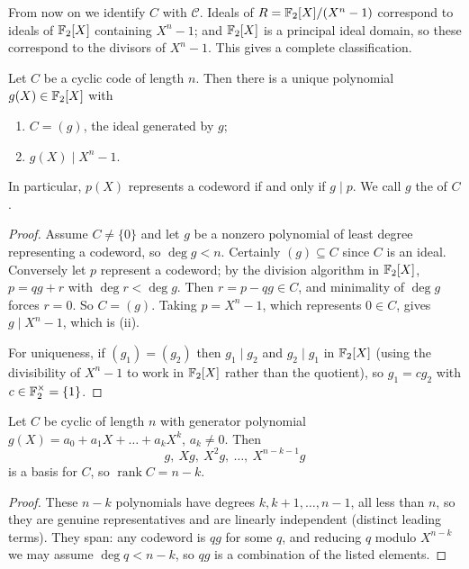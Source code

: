 \documentclass[a4paper]{scrartcl}
\DeclareMathOperator{\rank}{rank}
\newcommand{\Cc}{\mathcal{C}}
\begin{document}
From now on we identify $C$ with $\Cc$. Ideals of $R = \mathbb{F}_2[X]/(X^n-1)$ correspond to ideals of $\mathbb{F}_2[X]$ containing $X^n-1$; and $\mathbb{F}_2[X]$ is a principal ideal domain, so these correspond to the divisors of $X^n - 1$. This gives a complete classification.

\begin{theorem}\label{thm:genpoly}
	Let $C$ be a cyclic code of length $n$. Then there is a unique polynomial $g(X) \in \mathbb{F}_2[X]$ with
	\begin{enumerate}[label=(\roman*)]
		\item $C = (g)$, the ideal generated by $g$;
		\item $g(X) \mid X^n-1$.
	\end{enumerate}
	In particular, $p(X)$ represents a codeword if and only if $g \mid p$. We call $g$ the  of $C$.
\end{theorem}

\begin{proof}
	Assume $C \ne \{0\}$ and let $g$ be a nonzero polynomial of least degree representing a codeword, so $\deg g < n$. Certainly $(g) \subseteq C$ since $C$ is an ideal. Conversely let $p$ represent a codeword; by the division algorithm in $\mathbb{F}_2[X]$, $p = qg+r$ with $\deg r< \deg g$. Then $r = p - qg \in C$, and minimality of $\deg g$ forces $r=0$. So $C = (g)$. Taking $p = X^n-1$, which represents $0 \in C$, gives $g \mid X^n-1$, which is (ii).

	For uniqueness, if $(g_1) = (g_2)$ then $g_1 \mid g_2$ and $g_2 \mid g_1$ in $\mathbb{F}_2[X]$ (using the divisibility of $X^n-1$ to work in $\mathbb{F}_2[X]$ rather than the quotient), so $g_1 = cg_2$ with $c \in \mathbb{F}_2^\times = \{1\}$.
\end{proof}

\begin{lemma}\label{lem:cyclicbasis}
	Let $C$ be cyclic of length $n$ with generator polynomial $g(X) = a_0+a_1X+\dots+a_kX^k$, $a_k \ne 0$. Then
	$$g,\ Xg,\ X^2g,\ \dots,\ X^{n-k-1}g$$
	is a basis for $C$, so $\rank C = n-k$.
\end{lemma}

\begin{proof}
	These $n-k$ polynomials have degrees $k, k+1, \dots, n-1$, all less than $n$, so they are genuine representatives and are linearly independent (distinct leading terms). They span: any codeword is $qg$ for some $q$, and reducing $q$ modulo $X^{n-k}$ we may assume $\deg q < n-k$, so $qg$ is a combination of the listed elements.
\end{proof}
\end{document}
